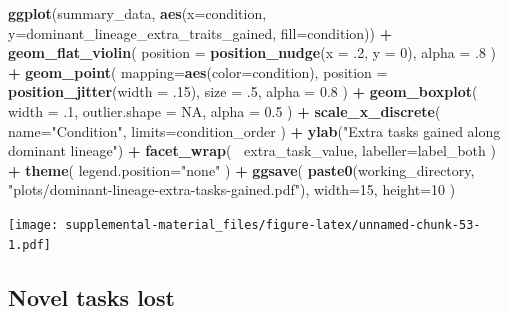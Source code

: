 \documentclass[]{book}
\newenvironment{Shaded}{\begin{snugshade}}{\end{snugshade}}
\newcommand{\DataTypeTok}[1]{\textcolor[rgb]{0.13,0.29,0.53}{#1}}
\newcommand{\DecValTok}[1]{\textcolor[rgb]{0.00,0.00,0.81}{#1}}
\newcommand{\FloatTok}[1]{\textcolor[rgb]{0.00,0.00,0.81}{#1}}
\newcommand{\KeywordTok}[1]{\textcolor[rgb]{0.13,0.29,0.53}{\textbf{#1}}}
\newcommand{\NormalTok}[1]{#1}
\newcommand{\OperatorTok}[1]{\textcolor[rgb]{0.81,0.36,0.00}{\textbf{#1}}}
\newcommand{\OtherTok}[1]{\textcolor[rgb]{0.56,0.35,0.01}{#1}}
\newcommand{\StringTok}[1]{\textcolor[rgb]{0.31,0.60,0.02}{#1}}
\begin{document}
\begin{Shaded}
\begin{Highlighting}[]
\KeywordTok{ggplot}\NormalTok{(summary_data, }\KeywordTok{aes}\NormalTok{(}\DataTypeTok{x=}\NormalTok{condition, }\DataTypeTok{y=}\NormalTok{dominant_lineage_extra_traits_gained, }\DataTypeTok{fill=}\NormalTok{condition)) }\OperatorTok{+}
\StringTok{  }\KeywordTok{geom_flat_violin}\NormalTok{(}
    \DataTypeTok{position =} \KeywordTok{position_nudge}\NormalTok{(}\DataTypeTok{x =} \FloatTok{.2}\NormalTok{, }\DataTypeTok{y =} \DecValTok{0}\NormalTok{),}
    \DataTypeTok{alpha =} \FloatTok{.8}
\NormalTok{  ) }\OperatorTok{+}
\StringTok{  }\KeywordTok{geom_point}\NormalTok{(}
    \DataTypeTok{mapping=}\KeywordTok{aes}\NormalTok{(}\DataTypeTok{color=}\NormalTok{condition),}
    \DataTypeTok{position =} \KeywordTok{position_jitter}\NormalTok{(}\DataTypeTok{width =} \FloatTok{.15}\NormalTok{),}
    \DataTypeTok{size =} \FloatTok{.5}\NormalTok{,}
    \DataTypeTok{alpha =} \FloatTok{0.8}
\NormalTok{  ) }\OperatorTok{+}
\StringTok{  }\KeywordTok{geom_boxplot}\NormalTok{(}
    \DataTypeTok{width =} \FloatTok{.1}\NormalTok{,}
    \DataTypeTok{outlier.shape =} \OtherTok{NA}\NormalTok{,}
    \DataTypeTok{alpha =} \FloatTok{0.5}
\NormalTok{  ) }\OperatorTok{+}
\StringTok{  }\KeywordTok{scale_x_discrete}\NormalTok{(}
    \DataTypeTok{name=}\StringTok{"Condition"}\NormalTok{,}
    \DataTypeTok{limits=}\NormalTok{condition_order}
\NormalTok{  ) }\OperatorTok{+}
\StringTok{  }\KeywordTok{ylab}\NormalTok{(}\StringTok{"Extra tasks gained along dominant lineage"}\NormalTok{) }\OperatorTok{+}
\StringTok{  }\KeywordTok{facet_wrap}\NormalTok{(}
    \OperatorTok{~}\NormalTok{extra_task_value,}
    \DataTypeTok{labeller=}\NormalTok{label_both}
\NormalTok{  ) }\OperatorTok{+}
\StringTok{  }\KeywordTok{theme}\NormalTok{(}
    \DataTypeTok{legend.position=}\StringTok{"none"}
\NormalTok{  ) }\OperatorTok{+}
\StringTok{  }\KeywordTok{ggsave}\NormalTok{(}
    \KeywordTok{paste0}\NormalTok{(working_directory, }\StringTok{"plots/dominant-lineage-extra-tasks-gained.pdf"}\NormalTok{),}
    \DataTypeTok{width=}\DecValTok{15}\NormalTok{,}
    \DataTypeTok{height=}\DecValTok{10}
\NormalTok{  )}
\end{Highlighting}
\end{Shaded}

\texttt{[image: supplemental-material\_files/figure-latex/unnamed-chunk-53-1.pdf]}

\hypertarget{novel-tasks-lost}{%
\subsection{Novel tasks lost}\label{novel-tasks-lost}}
\end{document}
